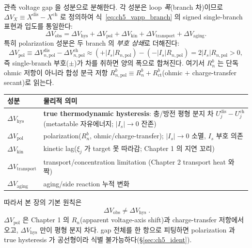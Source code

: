 \documentclass[11pt,a4paper]{article}
\newcommand{\transp}{\mathrm{transport}}
\newcommand{\dis}{\mathrm{dis}}
\newcommand{\chg}{\mathrm{ch}}
\newcommand{\hys}{\mathrm{hys}}
\newcommand{\pol}{\mathrm{pol}}
\newcommand{\kin}{\mathrm{kin}}
\newcommand{\obs}{\mathrm{obs}}
\newcommand{\ct}{\mathrm{ct}}
\begin{document}
관측 voltage gap 을 성분으로 분해한다. 각 성분은 loop \emph{폭}(branch 차)이므로 $\Delta V_X\equiv X^\dis-X^\chg$
로 정의하여 식~\eqref{eq:ch5_vapp_branch} 의 signed single-branch 표현과 입도를 통일한다:
\begin{equation}
\Delta V_\obs=\Delta V_\hys+\Delta V_\pol+\Delta V_\kin+\Delta V_\transp+\Delta V_{\mathrm{aging}}.
\label{eq:ch5_gap_decomp}
\end{equation}
특히 polarization 성분은 두 branch 의 \emph{부호 상쇄}로 더해진다:
\begin{equation}
\Delta V_\pol\equiv\Delta V_{n,\pol}^\dis-\Delta V_{n,\pol}^\chg
\approx(+|I_s|R_{n,\pol})-(-|I_s|R_{n,\pol})=2|I_s|R_{n,\pol}>0,
\label{eq:ch5_dvpol}
\end{equation}
즉 single-branch 부호($\pm$)가 차를 취하면 양의 폭으로 합쳐진다. 여기서 $R_n^b$ 는 단독 ohmic 저항이 아니라
합성 분극 저항 $R_{n,\pol}^b\equiv R_n^b+R_\ct^b$(ohmic $+$ charge-transfer secant)로 읽는다.
\begin{longtable}{p{} >{\raggedright\arraybackslash}p{}}
\toprule 성분 & 물리적 의미 \\ \midrule \endhead
$\Delta V_\hys$ & \textbf{true thermodynamic hysteresis}: 충/방전 평형 분지 차 $U_j^\dis-U_j^\chg$ (metastable 자유에너지; $|I_s|\to0$ 잔존) \\
$\Delta V_\pol$ & polarization($R_n^b$, ohmic/charge-transfer); $|I_s|\to0$ 소멸, $I_s$ 부호 의존 \\
$\Delta V_\kin$ & kinetic lag($\xi_j$ 가 target 못 따라감; Chapter 1 의 지연 꼬리) \\
$\Delta V_\transp$ & transport/concentration limitation (Chapter 2 transport heat 와 짝) \\
$\Delta V_{\mathrm{aging}}$ & aging/side reaction 누적 변화 \\
\bottomrule
\end{longtable}
따라서 본 장의 기본 원칙은
\begin{equation}
\boxed{\;\Delta V_\obs\ne\Delta V_\hys\;.}
\label{eq:ch5_obs_not_hys}
\end{equation}
$\Delta V_\pol$ 은 Chapter 1 의 $R_n$(apparent voltage-axis shift)과 charge-transfer 저항에서 오고,
$\Delta V_\hys$ 만이 평형 분지 차다. gap 전체를 한 항으로 피팅하면 polarization 과 true hysteresis 가 공선형이라
식별 불가능하다(\S\ref{sec:ch5_ident}).

\end{document}
